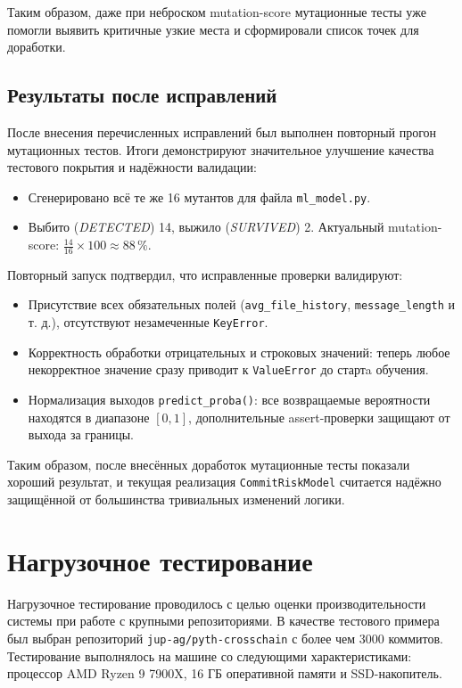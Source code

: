 Таким образом, даже при неброском mutation-score
мутационные тесты уже помогли выявить критичные узкие места
и сформировали список точек для доработки.

\vspace{0.7em}
\subsection{Результаты после исправлений}

После внесения перечисленных исправлений был выполнен повторный прогон мутационных тестов. Итоги демонстрируют значительное улучшение качества тестового покрытия и надёжности валидации:

\begin{itemize}
	\item Сгенерировано всё те же 16 мутантов для файла \texttt{ml\_model.py}.
	\item Выбито (\textit{DETECTED}) 14, выжило (\textit{SURVIVED}) 2.  
	Актуальный mutation-score: $\frac{14}{16}\!\times\!100 \approx 88\,\%$.
\end{itemize}

\noindent
Повторный запуск подтвердил, что исправленные проверки валидируют:
\begin{itemize}
	\item Присутствие всех обязательных полей (\verb|avg_file_history|, \verb|message_length| и т. д.), отсутствуют незамеченные \verb|KeyError|.
	\item Корректность обработки отрицательных и строковых значений: теперь любое некорректное значение сразу приводит к \verb|ValueError| до стартa обучения.
	\item Нормализация выходов \texttt{predict\_proba()}: все возвращаемые вероятности находятся в диапазоне $[0,1]$, дополнительные assert-проверки защищают от выхода за границы.
\end{itemize}

\vspace{0.7em}
\noindent
Таким образом, после внесённых доработок мутационные тесты показали хороший результат, и текущая реализация \texttt{CommitRiskModel} считается надёжно защищённой от большинства тривиальных изменений логики.

	

\section{Нагрузочное тестирование}

Нагрузочное тестирование проводилось с целью оценки производительности системы при работе с крупными репозиториями. В качестве тестового примера был выбран репозиторий \texttt{jup-ag/pyth-crosschain} с более чем 3000 коммитов. Тестирование выполнялось на машине со следующими характеристиками: процессор AMD Ryzen 9 7900X, 16 ГБ оперативной памяти и SSD-накопитель.

